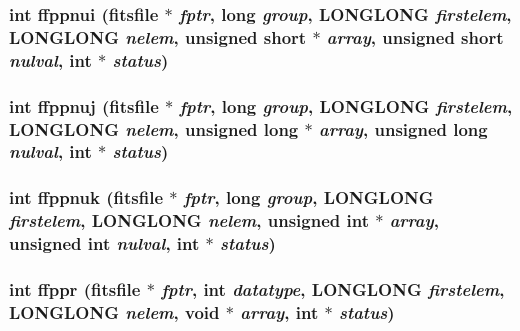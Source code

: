 \subsubsection{\setlength{\rightskip}{0pt plus 5cm}int ffppnui (\bf{fitsfile} $\ast$ {\em fptr}, long {\em group}, \bf{LONGLONG} {\em firstelem}, \bf{LONGLONG} {\em nelem}, unsigned short $\ast$ {\em array}, unsigned short {\em nulval}, int $\ast$ {\em status})}\label{test_2roimasker_2fitsio_8h_525842763bdaa4507a3a935d347a0462}


\subsubsection{\setlength{\rightskip}{0pt plus 5cm}int ffppnuj (\bf{fitsfile} $\ast$ {\em fptr}, long {\em group}, \bf{LONGLONG} {\em firstelem}, \bf{LONGLONG} {\em nelem}, unsigned long $\ast$ {\em array}, unsigned long {\em nulval}, int $\ast$ {\em status})}\label{test_2roimasker_2fitsio_8h_fc1d4fc6ae72ad09956653077c3813af}


\subsubsection{\setlength{\rightskip}{0pt plus 5cm}int ffppnuk (\bf{fitsfile} $\ast$ {\em fptr}, long {\em group}, \bf{LONGLONG} {\em firstelem}, \bf{LONGLONG} {\em nelem}, unsigned int $\ast$ {\em array}, unsigned int {\em nulval}, int $\ast$ {\em status})}\label{test_2roimasker_2fitsio_8h_95d87d24a1245de2f3cb4178a78cac04}


\subsubsection{\setlength{\rightskip}{0pt plus 5cm}int ffppr (\bf{fitsfile} $\ast$ {\em fptr}, int {\em datatype}, \bf{LONGLONG} {\em firstelem}, \bf{LONGLONG} {\em nelem}, void $\ast$ {\em array}, int $\ast$ {\em status})}\label{test_2roimasker_2fitsio_8h_f931a67d7160cdaf855057098337511f}


